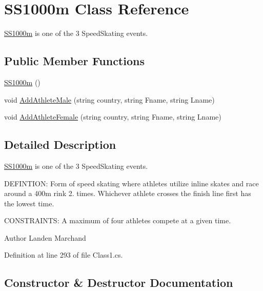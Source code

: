 \hypertarget{classSS1000m}{}\section{S\+S1000m Class Reference}
\label{classSS1000m}


\hyperlink{classSS1000m}{S\+S1000m} is one of the 3 Speed\+Skating events.  


\subsection*{Public Member Functions}
\begin{DoxyCompactItemize}
\item 
\hyperlink{classSS1000m_ad5337b60e7afee5828a7e0cf9899cca3}{S\+S1000m} ()
\item 
void \hyperlink{classSS1000m_afad3dba1017896895415a9f2e5f9eabb}{Add\+Athlete\+Male} (string country, string Fname, string Lname)
\item 
void \hyperlink{classSS1000m_af69afe7323ed0852a5809e3339f1ff01}{Add\+Athlete\+Female} (string country, string Fname, string Lname)
\end{DoxyCompactItemize}


\subsection{Detailed Description}
\hyperlink{classSS1000m}{S\+S1000m} is one of the 3 Speed\+Skating events. 

D\+E\+F\+I\+N\+T\+I\+ON\+: Form of speed skating where athletes utilize inline skates and race around a 400m rink 2. times. Whichever athlete crosses the finish line first has the lowest time.

C\+O\+N\+S\+T\+R\+A\+I\+N\+TS\+: A maximum of four athletes compete at a given time.\begin{DoxyAuthor}{Author}
Landen Marchand 
\end{DoxyAuthor}


Definition at line 293 of file Class1.\+cs.



\subsection{Constructor \& Destructor Documentation}
\mbox{\label{classSS1000m_ad5337b60e7afee5828a7e0cf9899cca3}} 
